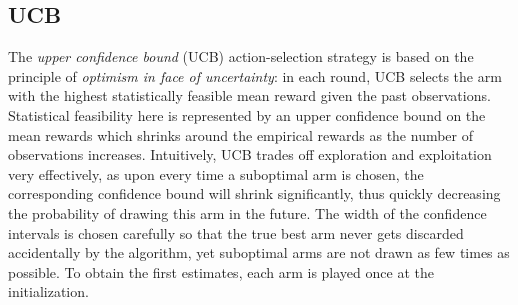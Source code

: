 \documentclass[preprint,12pt]{elsarticle}
\begin{document}
\subsection{UCB}
\label{section:bandits_ucb}		
The \emph{upper confidence bound} (UCB) action-selection strategy \cite{Agr95,BuKa96,auer2002finite} is based on the principle of \emph{optimism in face of uncertainty}: in each round, UCB selects the arm with the highest statistically feasible mean reward given the past observations. Statistical feasibility here is represented by an upper confidence bound on the mean rewards which shrinks around the empirical rewards as the number of observations increases. Intuitively, UCB trades off exploration and exploitation very effectively, as upon every time a suboptimal arm is chosen, the corresponding confidence bound will shrink significantly, thus quickly decreasing the probability of drawing this arm in the future. The width of the confidence intervals is chosen carefully so that the true best arm never gets discarded accidentally by the algorithm, yet suboptimal arms are not drawn as few times as possible. To obtain the first estimates, each arm is played once at the initialization. 
\end{document}
